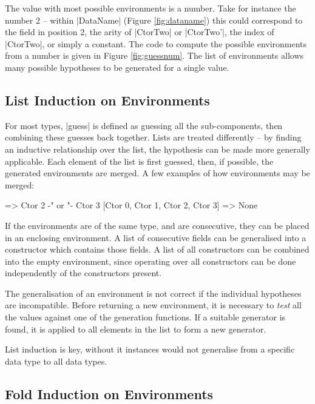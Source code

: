 \documentclass{llncs}
\begin{document}
The value with most possible environments is a number. Take for instance the number 2 -- within |DataName| (Figure \ref{fig:dataname}) this could correspond to the field in position 2, the arity of |CtorTwo| or |CtorTwo'|, the index of |CtorTwo|, or simply a constant. The code to compute the possible environments from a number is given in Figure \ref{fig:guessnum}. The list of environments allows many possible hypotheses to be generated for a single value.


\subsection{List Induction on Environments}
\label{sec:induction}

For most types, |guess| is defined as guessing all the sub-components, then combining these guesses back together. Lists are treated differently -- by finding an inductive relationship over the list, the hypothesis can be made more generally applicable. Each element of the list is first guessed, then, if possible, the generated environments are merged. A few examples of how environments may be merged:

\begin{code}
                => Ctor 2 {-" \;\; or \;\; "-} Ctor 3
[Ctor 0, Ctor 1, Ctor 2, Ctor 3]  => None
\end{code}

If the environments are of the same type, and are consecutive, they can be placed in an enclosing environment. A list of consecutive fields can be generalised into a constructor which contains those fields. A list of all constructors can be combined into the empty environment, since operating over all constructors can be done independently of the constructors present.

The generalisation of an environment is not correct if the individual hypotheses are incompatible. Before returning a new environment, it is necessary to \textit{test} all the values against one of the generation functions. If a suitable generator is found, it is applied to all elements in the list to form a new generator.

List induction is key, without it instances would not generalise from a specific data type to all data types.

\subsection{Fold Induction on Environments}
\label{sec:fold}
\end{document}
